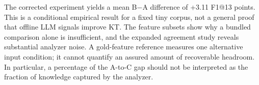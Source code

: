 The corrected experiment yields a mean B$-$A difference of +3.11 F1@13 points. This is a conditional empirical result for a fixed tiny corpus, not a general proof that offline LLM signals improve KT. The feature subsets show why a bundled comparison alone is insufficient, and the expanded agreement study reveals substantial analyzer noise. A gold-feature reference measures one alternative input condition; it cannot quantify an assured amount of recoverable headroom. In particular, a percentage of the A-to-C gap should not be interpreted as the fraction of knowledge captured by the analyzer.
